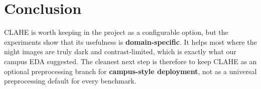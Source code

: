 \documentclass[11pt]{article}
\begin{document}
\section*{Conclusion}
CLAHE is worth keeping in the project as a configurable option, but the experiments show that its usefulness is \textbf{domain-specific}. It helps most where the night images are truly dark and contrast-limited, which is exactly what our campus EDA suggested. The cleanest next step is therefore to keep CLAHE as an optional preprocessing branch for \textbf{campus-style deployment}, not as a universal preprocessing default for every benchmark.
\end{document}
